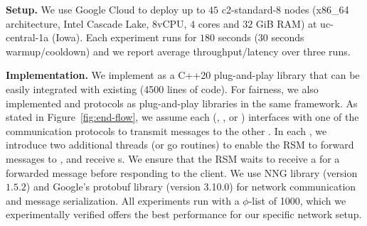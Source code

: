 {\bf Setup.}
We use Google Cloud to deploy up to $45$ c2-standard-8 nodes 
(x86\_64 architecture, Intel Cascade Lake, $8$vCPU, $4$ cores and $32$ GiB RAM) 
at uc-central-1a (Iowa).
Each experiment runs for $180$ seconds ($30$ seconds warmup/cooldown) and 
we report average throughput/latency over three runs. 


{\bf Implementation.}
We implement \Scrooge{} as a C++20 plug-and-play library that can be easily integrated with existing  (4500 lines of code). 
For fairness, we also implemented \ATA{} and \OTO{} protocols as plug-and-play libraries in the same framework.
As stated in Figure~\ref{fig:end-flow}, we assume each \RSM{} (\File{}, \ResDB{}, \Algo{} or \Raft{})
interfaces with one of the communication protocols to transmit messages to the other \RSM{}.
In each \RSM{}, we introduce two additional threads (or go routines) to enable the RSM to forward messages to \Scrooge{}, and receive \quack{}s. 
We ensure that the RSM waits to receive a \quack{} for a forwarded message before responding to the client. 
We use NNG library (version $1.5.2$) and Google's protobuf 
library (version 3.10.0) for network communication and message serialization. All experiments run \Scrooge{} with a $\phi$-list of 1000, which we experimentally verified offers the best performance for our specific network setup.

%
%
%



